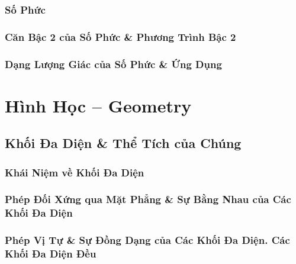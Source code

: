 \documentclass[oneside]{book}
\numberwithin{equation}{section}
\begin{document}
\section{Số Phức}


\section{Căn Bậc 2 của Số Phức \& Phương Trình Bậc 2}


\section{Dạng Lượng Giác của Số Phức \& Ứng Dụng}


\part{Hình Học -- Geometry}

\chapter{Khối Đa Diện \& Thể Tích của Chúng}

\section{Khái Niệm về Khối Đa Diện}


\section{Phép Đối Xứng qua Mặt Phẳng \& Sự Bằng Nhau của Các Khối Đa Diện}


\section{Phép Vị Tự \& Sự Đồng Dạng của Các Khối Đa Diện. Các Khối Đa Diện Đều}
\end{document}
